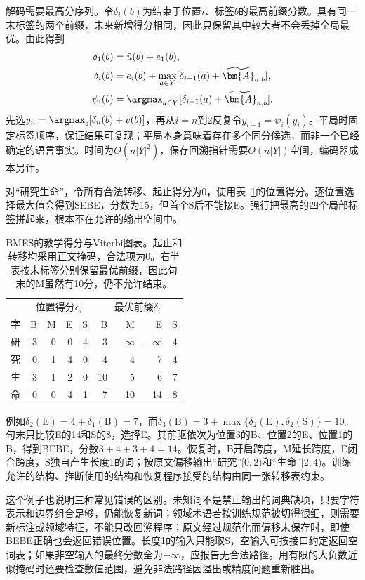 解码需要最高分序列。令$\delta_i(b)$为结束于位置$i$、标签$b$的最高前缀分数。具有同一末标签的两个前缀，未来新增得分相同，因此只保留其中较大者不会丢掉全局最优。由此得到
\begin{align}
 \delta_1(b)&=\tilde u(b)+e_1(b),\nonumber\\
 \delta_i(b)&=e_i(b)+\max_{a\in Y}
   [\delta_{i-1}(a)+\widetilde{\bm{A}}_{a,b}],\label{eq:nlp-analysis-viterbi}\\
 \psi_i(b)&=\argmax_{a\in Y}
   [\delta_{i-1}(a)+\widetilde{\bm{A}}_{a,b}].\nonumber
\end{align}
先选$y_n=\argmax_b[\delta_n(b)+\tilde v(b)]$，再从$i=n$到2反复令$y_{i-1}=\psi_i(y_i)$。平局时固定标签顺序，保证结果可复现；平局本身意味着存在多个同分候选，而非一个已经确定的语言事实。时间为$O(n|Y|^2)$，保存回溯指针需要$O(n|Y|)$空间，编码器成本另计。

对“研究生命”，令所有合法转移、起止得分为0，使用表~\ref{tab:nlp-analysis-viterbi}的位置得分。逐位置选择最大值会得到SEBE，分数为15，但首个S后不能接E。强行把最高的四个局部标签拼起来，根本不在允许的输出空间中。

\begin{table}[htbp]
  \centering
  \begin{tabular}{@{}c rrrr rrrr@{}}
    \toprule
    &\multicolumn{4}{c}{位置得分$e_i$}
    &\multicolumn{4}{c}{最优前缀$\delta_i$}\\
    字&B&M&E&S&B&M&E&S\\
    \midrule
    研&3&0&0&4&3&$-\infty$&$-\infty$&4\\
    究&0&1&4&0&4&4&7&4\\
    生&3&1&2&0&10&5&6&7\\
    命&0&0&4&1&7&10&14&8\\
    \bottomrule
  \end{tabular}
  \caption{BMES的教学得分与Viterbi图表。起止和转移均采用正文掩码，合法项为0。右半表按末标签分别保留最优前缀，因此句末的M虽然有10分，仍不允许结束。}
  \label{tab:nlp-analysis-viterbi}
\end{table}

例如$\delta_2(\mathrm E)=4+\delta_1(\mathrm B)=7$，而$\delta_3(\mathrm B)=3+\max\{\delta_2(\mathrm E),\delta_2(\mathrm S)\}=10$。句末只比较E的14和S的8，选择E。其前驱依次为位置3的B、位置2的E、位置1的B，得到BEBE，分数$3+4+3+4=14$。恢复时，B开启跨度，M延长跨度，E闭合跨度，S独自产生长度1的词；按原文偏移输出“研究”$[0,2)$和“生命”$[2,4)$。训练允许的结构、推断使用的结构和恢复程序接受的结构由同一张转移表约束。

这个例子也说明三种常见错误的区别。未知词不是禁止输出的词典缺项，只要字符表示和边界组合足够，仍能恢复新词；领域术语若按训练规范被切得很细，则需要新标注或领域特征，不能只改回溯程序；原文经过规范化而偏移未保存时，即使BEBE正确也会返回错误位置。长度1的输入只能取S，空输入可按接口约定返回空词表；如果非空输入的最终分数全为$-\infty$，应报告无合法路径。用有限的大负数近似掩码时还要检查数值范围，避免非法路径因溢出或精度问题重新胜出。

